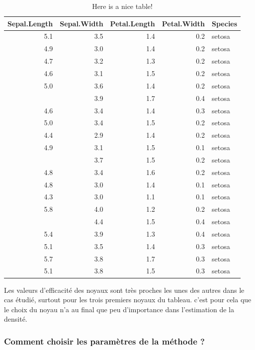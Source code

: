 \documentclass[
]{book}
\begin{document}
\begin{table}

\caption{\label{tab:nice-tab}Here is a nice table!}
\centering
\begin{tabular}[t]{rrrrl}
\toprule
Sepal.Length & Sepal.Width & Petal.Length & Petal.Width & Species\\
\midrule
5.1 & 3.5 & 1.4 & 0.2 & setosa\\
4.9 & 3.0 & 1.4 & 0.2 & setosa\\
4.7 & 3.2 & 1.3 & 0.2 & setosa\\
4.6 & 3.1 & 1.5 & 0.2 & setosa\\
5.0 & 3.6 & 1.4 & 0.2 & setosa\\
\addlinespace
5.4 & 3.9 & 1.7 & 0.4 & setosa\\
4.6 & 3.4 & 1.4 & 0.3 & setosa\\
5.0 & 3.4 & 1.5 & 0.2 & setosa\\
4.4 & 2.9 & 1.4 & 0.2 & setosa\\
4.9 & 3.1 & 1.5 & 0.1 & setosa\\
\addlinespace
5.4 & 3.7 & 1.5 & 0.2 & setosa\\
4.8 & 3.4 & 1.6 & 0.2 & setosa\\
4.8 & 3.0 & 1.4 & 0.1 & setosa\\
4.3 & 3.0 & 1.1 & 0.1 & setosa\\
5.8 & 4.0 & 1.2 & 0.2 & setosa\\
\addlinespace
5.7 & 4.4 & 1.5 & 0.4 & setosa\\
5.4 & 3.9 & 1.3 & 0.4 & setosa\\
5.1 & 3.5 & 1.4 & 0.3 & setosa\\
5.7 & 3.8 & 1.7 & 0.3 & setosa\\
5.1 & 3.8 & 1.5 & 0.3 & setosa\\
\bottomrule
\end{tabular}
\end{table}

\begin{rem}
Les valeurs d'efficacité des noyaux sont très proches les unes des autres dans le cas étudié, surtout pour les trois premiers noyaux du tableau. c'est pour cela que le choix du noyau n'a au final que peu d'importance dans l'estimation de la densité. 
\end{rem}

\hypertarget{comment-choisir-les-paramuxe8tres-de-la-muxe9thode}{%
\subsubsection{Comment choisir les paramètres de la méthode ?}\label{comment-choisir-les-paramuxe8tres-de-la-muxe9thode}}
\end{document}
